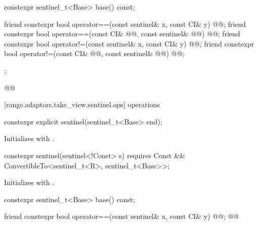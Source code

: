 {\begin{codeblock}
{{    constexpr sentinel_t<Base> base() const;

    friend constexpr bool operator==(const sentinel& x, const CI& y)
      @@;
    friend constexpr bool operator==(const CI& @@, const sentinel& @@)
      @@;
    friend constexpr bool operator!=(const sentinel& x, const CI& y)
      @@;
    friend constexpr bool operator!=(const CI& @@, const sentinel& @@)
      @@;
  };
}@\oldtxt{\}}@
\end{codeblock}

[range.adaptors.take_view.sentinel.ops]{ operations}

\begin{itemdecl}
constexpr explicit sentinel(sentinel_t<Base> end);
\end{itemdecl}

\begin{itemdescr}
\pnum
\effects Initializes  with .
\end{itemdescr}

%
\begin{itemdecl}
constexpr sentinel(sentinel<!Const> s)
  requires Const && ConvertibleTo<sentinel_t<R>, sentinel_t<Base>>;
\end{itemdecl}

\begin{itemdescr}
\pnum
\effects Initializes  with .
\end{itemdescr}

\begin{itemdecl}
constexpr sentinel_t<Base> base() const;
\end{itemdecl}

\begin{itemdescr}
\pnum
\oldtxt{\returns}  
\end{itemdescr}

\begin{itemdecl}
friend constexpr bool operator==(const sentinel& x, const CI& y)
  @@;
@@
\end{itemdecl}

}
